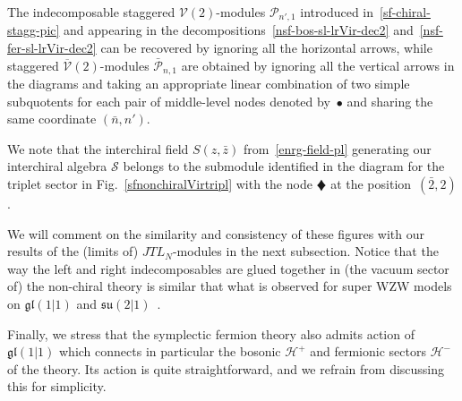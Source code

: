 \documentclass[11pt]{article}
\newcommand{\JTL}[1]{JTL_{#1}}
\newcommand{\Vir}{\mathcal{V}}
\newcommand{\interchalg}{\mathcal{S}}
\newcommand{\gl}{\mathfrak{gl}}
\newcommand{\bimnch}{\boldsymbol{\mathcal{H}}}
\newcommand{\bimnbos}{\bimnch^{+}}
\newcommand{\bimnfer}{\bimnch^{-}}
\newcommand{\bz}{\bar{z}}
\newcommand{\enrg}{S}
\newcommand{\VP}{\mathcal{P}}
\theoremstyle{definition}
\begin{document}
The indecomposable staggered $\Vir(2)$-modules
$\VP_{n',1}$ introduced in~\eqref{sf-chiral-stagg-pic} and appearing
in the decompositions~\eqref{nsf-bos-sl-lrVir-dec2}
and~\eqref{nsf-fer-sl-lrVir-dec2}  can be recovered by ignoring all the
horizontal arrows, while staggered $\overline{\Vir}(2)$-modules
$\bar{\VP}_{n,1}$
 are obtained by ignoring all the vertical arrows
in the  diagrams and taking an appropriate linear combination of two
simple subquotents for each
pair of middle-level nodes denoted by~$\bullet$ and sharing the same coordinate  $(\bar{n},n')$.

We note that the interchiral field $\enrg(z,\bz)$ from~\eqref{enrg-field-pl} generating our interchiral algebra $\interchalg$ belongs to the submodule identified in the diagram for the triplet sector in Fig.~\ref {sfnonchiralVirtripl} with the node {\scriptsize$\vardiamond$} at the position~$(\bar{2},2)$.

We will comment on the similarity and consistency of these figures with our results
of the (limits of) $\JTL{N}$-modules in the next subsection. Notice that the way the left and right
indecomposables are glued together in (the vacuum sector of) the non-chiral theory is similar
that what is observed for super WZW models on $\gl(1|1)$ and $\mathfrak{su}(2|1)$~\cite{SaleurSchomerus}.

Finally, we stress that the symplectic fermion theory also admits
action of $\gl(1|1)$ which connects in particular the bosonic
$\bimnbos$ and fermionic sectors $\bimnfer$ of the theory. Its action
is quite straightforward, and we refrain from discussing this for
simplicity.
\end{document}
